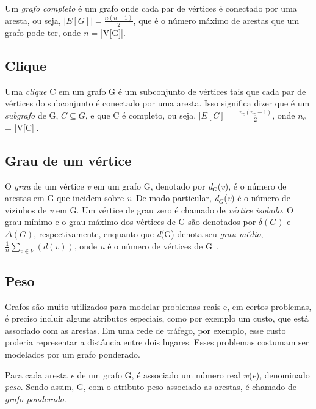 Um \emph{grafo completo} é um grafo onde cada par de vértices é conectado por uma aresta, ou seja, $|E[G]| = \frac{n(n-1)}{2}$, que é o número máximo de arestas que um grafo pode ter, onde \emph{n} = |V[G]|.


\subsection{Clique}
\label{conceitos__grafo--clique}

Uma \emph{clique} C em um grafo G é um subconjunto de vértices tais que cada par de vértices do subconjunto é conectado por uma aresta. Isso significa dizer que é um \emph{subgrafo} de G, $C \subseteq G$, e que C é completo, ou seja, $|E[C]| = \frac{n_{c}(n_{c}-1)}{2}$, onde $n_{c}$ = |V[C]|.


\subsection{Grau de um vértice}
\label{conceitos__grafo--grau}

\def \variable {\emph{v}}

O \emph{grau} de um vértice \emph{v} em um grafo G, denotado por \emph{d$_{G}$}(\emph{v}), é o número de arestas em G que incidem sobre \emph{v}. De modo particular, \emph{d$_{G}$}(\emph{v}) é o número de vizinhos de \emph{v} em G. Um vértice de grau zero é chamado de \emph{vértice isolado}. O grau mínimo e o grau máximo dos vértices de G são denotados por $\delta(G)$ e $\Delta(G)$, respectivamente, enquanto que \emph{d}(G) denota seu \emph{grau médio}, $\frac{1}{n}\sum_{v\in V}(d(v))$, onde \emph{n} é o número de vértices de G~\cite{bondy1976graph}.

\subsection{Peso}
\label{conceitos__grafo--peso}

Grafos são muito utilizados para modelar problemas reais e, em certos problemas, é preciso incluir alguns atributos especiais, como por exemplo um custo, que está associado com as arestas. Em uma rede de tráfego, por exemplo, esse custo poderia representar a distância entre dois lugares. Esses problemas costumam ser modelados por um grafo ponderado.

Para cada aresta \emph{e} de um grafo G, é associado um número real \emph{w}(\emph{e}), denominado \emph{peso}. Sendo assim, G, com o atributo peso associado as arestas, é chamado de \emph{grafo ponderado}.

